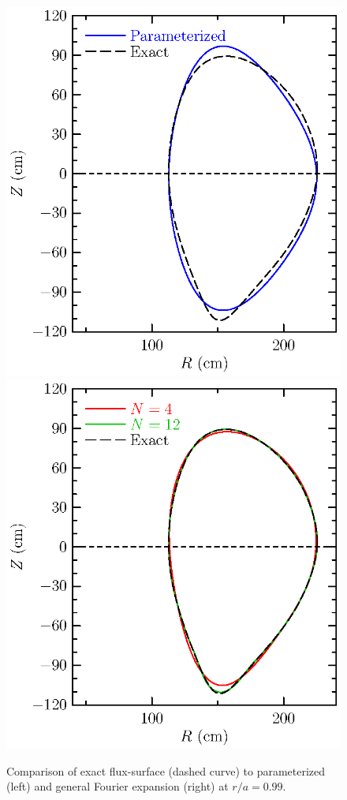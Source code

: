 \begin{figure}
\begin{center}
\includegraphics[scale=0.8]{figures/surf2.eps}
\hskip 0.1in
\includegraphics[scale=0.8]{figures/surf3.eps}
\caption{Comparison of exact flux-surface (dashed curve) to 
parameterized (left) and general Fourier expansion (right)
at $r/a=0.99$.}
\label{fig.surf23}
\end{center}
\end{figure}

